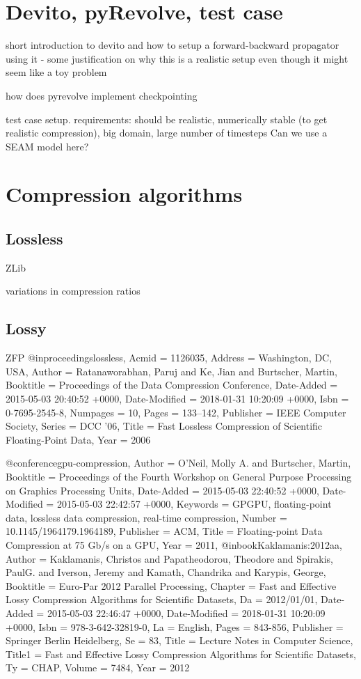 \documentclass[conference]{IEEEtran}
\begin{document}
\section{Devito, pyRevolve, test case}
short introduction to devito and how to setup a forward-backward
propagator using it - some justification on why this is a realistic
setup even though it might seem like a toy problem

how does pyrevolve implement checkpointing

test case setup.
requirements: should be realistic, numerically stable (to get
realistic compression), big domain,
large number of timesteps
Can we use a SEAM model here?
\section{Compression algorithms}
\subsection{Lossless}
ZLib

variations in compression ratios
\subsection{Lossy}
ZFP
@inproceedings{lossless,
    Acmid = {1126035},
    Address = {Washington, DC, USA},
    Author = {Ratanaworabhan, Paruj and Ke, Jian and Burtscher, Martin},
    Booktitle = {Proceedings of the Data Compression Conference},
    Date-Added = {2015-05-03 20:40:52 +0000},
    Date-Modified = {2018-01-31 10:20:09 +0000},
    Isbn = {0-7695-2545-8},
    Numpages = {10},
    Pages = {133--142},
    Publisher = {IEEE Computer Society},
    Series = {DCC '06},
    Title = {Fast Lossless Compression of Scientific Floating-Point Data},
    Year = {2006}}

@conference{gpu-compression,
    Author = {O'Neil, Molly A. and Burtscher, Martin},
    Booktitle = {Proceedings of the Fourth Workshop on General Purpose Processing on Graphics Processing Units},
    Date-Added = {2015-05-03 22:40:52 +0000},
    Date-Modified = {2015-05-03 22:42:57 +0000},
    Keywords = {GPGPU, floating-point data, lossless data compression, real-time compression},
    Number = {10.1145/1964179.1964189},
    Publisher = {ACM},
    Title = {Floating-point Data Compression at 75 Gb/s on a {GPU}},
    Year = {2011},
}
@inbook{Kaklamanis:2012aa,
    Author = {Kaklamanis, Christos and Papatheodorou, Theodore and Spirakis, PaulG. and Iverson, Jeremy and Kamath, Chandrika and Karypis, George},
    Booktitle = {Euro-Par 2012 Parallel Processing},
    Chapter = {Fast and Effective Lossy Compression Algorithms for Scientific Datasets},
    Da = {2012/01/01},
    Date-Added = {2015-05-03 22:46:47 +0000},
    Date-Modified = {2018-01-31 10:20:09 +0000},
    Isbn = {978-3-642-32819-0},
    La = {English},
    Pages = {843-856},
    Publisher = {Springer Berlin Heidelberg},
    Se = {83},
    Title = {Lecture Notes in Computer Science},
    Title1 = {Fast and Effective Lossy Compression Algorithms for Scientific Datasets},
    Ty = {CHAP},
    Volume = {7484},
    Year = {2012}}
\end{document}
